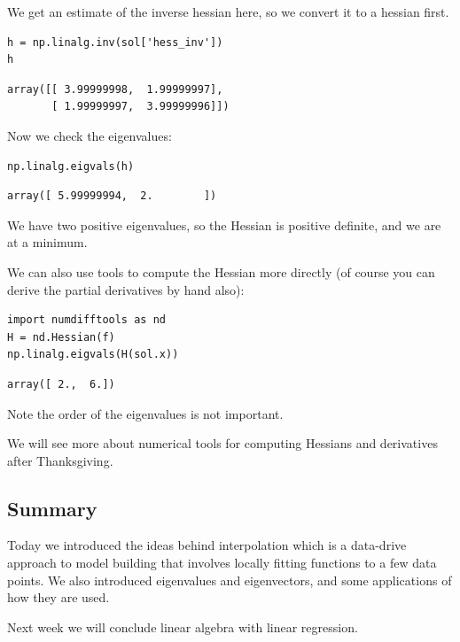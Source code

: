 \documentclass[11pt]{article}
\begin{document}
We get an estimate of the inverse hessian here, so we convert it to a hessian first.

\begin{verbatim}
h = np.linalg.inv(sol['hess_inv'])
h
\end{verbatim}

\begin{verbatim}
array([[ 3.99999998,  1.99999997],
       [ 1.99999997,  3.99999996]])
\end{verbatim}

Now we check the eigenvalues:

\begin{verbatim}
np.linalg.eigvals(h)
\end{verbatim}

\begin{verbatim}
array([ 5.99999994,  2.        ])
\end{verbatim}

We have two positive eigenvalues, so the Hessian is positive definite, and we are at a minimum.

We can also use tools to compute the Hessian more directly (of course you can derive the partial derivatives by hand also):

\begin{verbatim}
import numdifftools as nd
H = nd.Hessian(f)
np.linalg.eigvals(H(sol.x))
\end{verbatim}

\begin{verbatim}
array([ 2.,  6.])
\end{verbatim}

Note the order of the eigenvalues is not important.

We will see more about numerical tools for computing Hessians and derivatives after Thanksgiving.


\subsection{Summary}
\label{sec:org6d2c1cf}

Today we introduced the ideas behind interpolation which is a data-drive approach to model building that involves locally fitting functions to a few data points. We also introduced eigenvalues and eigenvectors, and some applications of how they are used.

Next week we will conclude linear algebra with linear regression.
\end{document}
